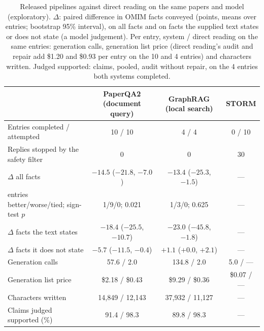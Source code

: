 \documentclass{article} %
\begin{document}
\begin{table}[!htbp]
\caption{Released pipelines against direct reading on the same papers and model (exploratory). $\Delta$: paired difference in OMIM facts conveyed (points, means over entries; bootstrap 95\% interval), on all facts and on facts the supplied text states or does not state (a model judgement). Per entry, system / direct reading on the same entries: generation calls, generation list price (direct reading's audit and repair add \$1.20 and \$0.93 per entry on the 10 and 4 entries) and characters written. Judged supported: claims, pooled, audit without repair, on the 4 entries both systems completed.}
\label{tab:released}
\begin{center}
\footnotesize
\setlength{\tabcolsep}{4pt}
\begin{tabular}{@{}lccc@{}}
\toprule
 & PaperQA2 (document query) & GraphRAG (local search) & STORM \\
\midrule
Entries completed / attempted & 10 / 10 & 4 / 4 & 0 / 10 \\
Replies stopped by the safety filter & 0 & 0 & 30 \\
$\Delta$ all facts & $-14.5$ ($-21.8$, $-7.0$) & $-13.4$ ($-25.3$, $-1.5$) & --- \\
\quad entries better/worse/tied; sign-test $p$ & 1/9/0; 0.021 & 1/3/0; 0.625 & --- \\
$\Delta$ facts the text states & $-18.4$ ($-25.5$, $-10.7$) & $-23.0$ ($-45.8$, $-1.8$) & --- \\
$\Delta$ facts it does not state & $-5.7$ ($-11.5$, $-0.4$) & $+1.1$ ($+0.0$, $+2.1$) & --- \\
Generation calls & 57.6 / 2.0 & 134.8 / 2.0 & 5.0 / --- \\
Generation list price & \$2.18 / \$0.43 & \$9.29 / \$0.36 & \$0.07 / --- \\
Characters written & 14,849 / 12,143 & 37,932 / 11,127 & --- \\
Claims judged supported (\%) & 91.4 / 98.3 & 89.8 / 98.3 & --- \\
\bottomrule
\end{tabular}
\end{center}
\end{table}
\end{document}
